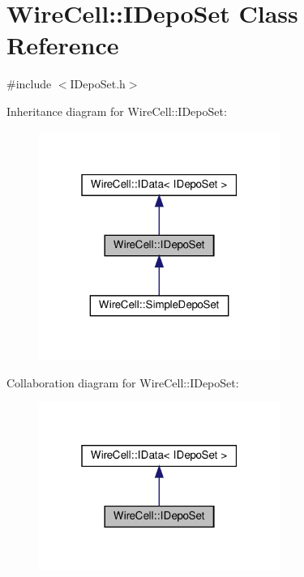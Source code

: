 \hypertarget{class_wire_cell_1_1_i_depo_set}{}\section{Wire\+Cell\+:\+:I\+Depo\+Set Class Reference}
\label{class_wire_cell_1_1_i_depo_set}


{\ttfamily \#include $<$I\+Depo\+Set.\+h$>$}



Inheritance diagram for Wire\+Cell\+:\+:I\+Depo\+Set\+:
\nopagebreak
\begin{figure}[H]
\begin{center}
\leavevmode
\includegraphics[width=223pt]{class_wire_cell_1_1_i_depo_set__inherit__graph}
\end{center}
\end{figure}


Collaboration diagram for Wire\+Cell\+:\+:I\+Depo\+Set\+:
\nopagebreak
\begin{figure}[H]
\begin{center}
\leavevmode
\includegraphics[width=223pt]{class_wire_cell_1_1_i_depo_set__coll__graph}
\end{center}
\end{figure}
